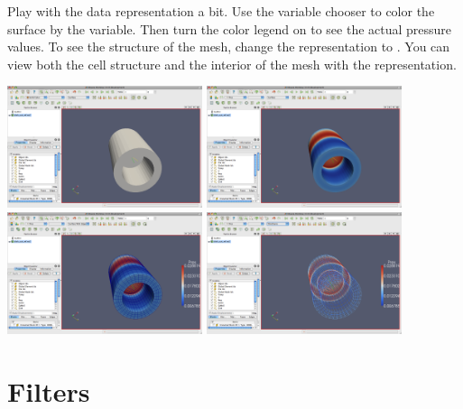 Play with the data representation a bit.  Use the variable chooser to color
the surface by the  variable.  Then turn the color legend on to
see the actual pressure values.  To see the structure of the mesh, change
the representation to .  You can view both the cell
structure and the interior of the mesh with the 
representation.

\begin{inlinefig}
  \includegraphics[width=2.25in]{images/DataRepresentation1}
  \includegraphics[width=2.25in]{images/DataRepresentation2} \\
  \includegraphics[width=2.25in]{images/DataRepresentation3}
  \includegraphics[width=2.25in]{images/DataRepresentation4}
\end{inlinefig}


\section{Filters}

